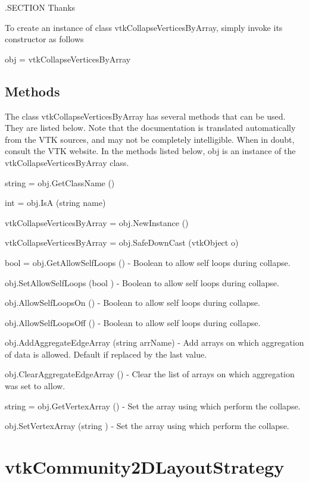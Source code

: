 .S\-E\-C\-T\-I\-O\-N Thanks

To create an instance of class vtk\-Collapse\-Vertices\-By\-Array, simply invoke its constructor as follows \begin{DoxyVerb}  obj = vtkCollapseVerticesByArray
\end{DoxyVerb}
 \hypertarget{vtkwidgets_vtkxyplotwidget_Methods}{}\subsection{Methods}\label{vtkwidgets_vtkxyplotwidget_Methods}
The class vtk\-Collapse\-Vertices\-By\-Array has several methods that can be used. They are listed below. Note that the documentation is translated automatically from the V\-T\-K sources, and may not be completely intelligible. When in doubt, consult the V\-T\-K website. In the methods listed below, {\ttfamily obj} is an instance of the vtk\-Collapse\-Vertices\-By\-Array class. 
\begin{DoxyItemize}
\item {\ttfamily string = obj.\-Get\-Class\-Name ()}  
\item {\ttfamily int = obj.\-Is\-A (string name)}  
\item {\ttfamily vtk\-Collapse\-Vertices\-By\-Array = obj.\-New\-Instance ()}  
\item {\ttfamily vtk\-Collapse\-Vertices\-By\-Array = obj.\-Safe\-Down\-Cast (vtk\-Object o)}  
\item {\ttfamily bool = obj.\-Get\-Allow\-Self\-Loops ()} -\/ Boolean to allow self loops during collapse.  
\item {\ttfamily obj.\-Set\-Allow\-Self\-Loops (bool )} -\/ Boolean to allow self loops during collapse.  
\item {\ttfamily obj.\-Allow\-Self\-Loops\-On ()} -\/ Boolean to allow self loops during collapse.  
\item {\ttfamily obj.\-Allow\-Self\-Loops\-Off ()} -\/ Boolean to allow self loops during collapse.  
\item {\ttfamily obj.\-Add\-Aggregate\-Edge\-Array (string arr\-Name)} -\/ Add arrays on which aggregation of data is allowed. Default if replaced by the last value.  
\item {\ttfamily obj.\-Clear\-Aggregate\-Edge\-Array ()} -\/ Clear the list of arrays on which aggregation was set to allow.  
\item {\ttfamily string = obj.\-Get\-Vertex\-Array ()} -\/ Set the array using which perform the collapse.  
\item {\ttfamily obj.\-Set\-Vertex\-Array (string )} -\/ Set the array using which perform the collapse.  
\end{DoxyItemize}\hypertarget{vtkinfovis_vtkcommunity2dlayoutstrategy}{}\section{vtk\-Community2\-D\-Layout\-Strategy}\label{vtkinfovis_vtkcommunity2dlayoutstrategy}
